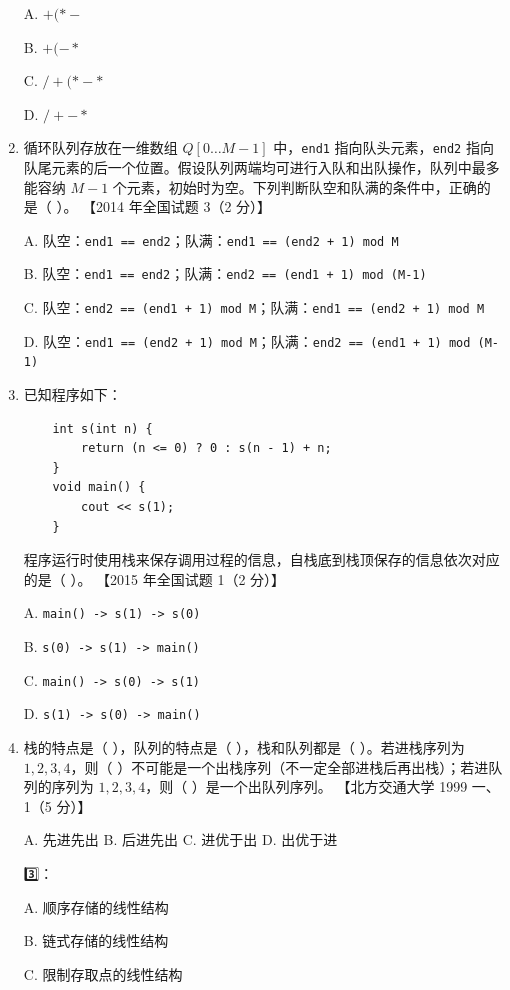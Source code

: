 \documentclass[lang=cn,newtx,10pt,scheme=chinese]{elegantbook}
\begin{document}
\begin{enumerate}
    A. $+ ( * -$

    B.  $+ ( - *$

    C.  $/+(*-*$

    D.  $/+-*$

    \item 循环队列存放在一维数组 $Q[0 \ldots M-1]$ 中，\texttt{end1} 指向队头元素，\texttt{end2} 指向队尾元素的后一个位置。假设队列两端均可进行入队和出队操作，队列中最多能容纳 $M-1$ 个元素，初始时为空。下列判断队空和队满的条件中，正确的是（ ）。  
    【2014 年全国试题 3（2 分）】  

    A. 队空：\texttt{end1 == end2}；队满：\texttt{end1 == (end2 + 1) mod M}  

    B. 队空：\texttt{end1 == end2}；队满：\texttt{end2 == (end1 + 1) mod (M-1)}  

    C. 队空：\texttt{end2 == (end1 + 1) mod M}；队满：\texttt{end1 == (end2 + 1) mod M}  

    D. 队空：\texttt{end1 == (end2 + 1) mod M}；队满：\texttt{end2 == (end1 + 1) mod (M-1)}  

    \item 已知程序如下：
    \begin{verbatim}
    int s(int n) {
        return (n <= 0) ? 0 : s(n - 1) + n;
    }
    void main() {
        cout << s(1);
    }
    \end{verbatim}
    程序运行时使用栈来保存调用过程的信息，自栈底到栈顶保存的信息依次对应的是（ ）。  
    【2015 年全国试题 1（2 分）】  

    A. \texttt{main() -> s(1) -> s(0)}  

    B. \texttt{s(0) -> s(1) -> main()}  

    C. \texttt{main() -> s(0) -> s(1)}  

    D. \texttt{s(1) -> s(0) -> main()}  

    \item 栈的特点是（ ），队列的特点是（ ），栈和队列都是（ ）。若进栈序列为 $1, 2, 3, 4$，则（ ）不可能是一个出栈序列（不一定全部进栈后再出栈）；若进队列的序列为 $1, 2, 3, 4$，则（ ）是一个出队列序列。  
    【北方交通大学 1999 一、1（5 分）】  
   
    A. 先进先出 \quad B. 后进先出 \quad C. 进优于出 \quad D. 出优于进  

    3️⃣：  

    A. 顺序存储的线性结构 

    B. 链式存储的线性结构  

    C. 限制存取点的线性结构  


\end{enumerate}
\end{document}
